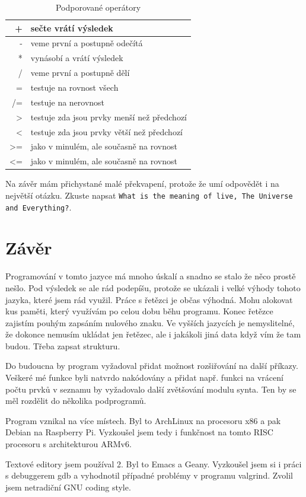 \documentclass[a4paper, 12pt]{article}
\begin{document}
\begin{table}
\centering
\begin{tabular}{|r|l|}
\hline
+ & sečte vrátí výsledek\\ \hline
- & veme první a postupně odečítá\\ \hline
* & vynásobí a vrátí výsledek\\ \hline
/ & veme první a postupně dělí\\ \hline
= & testuje na rovnost všech\\ \hline
/= & testuje na nerovnost\\ \hline
\textgreater{} & testuje zda jsou prvky menší než předchozí\\ \hline
\textless{} & testuje zda jsou prvky větší než předchozí\\ \hline
\textgreater{=} & jako v minulém, ale současně na rovnost\\ \hline
\textless{=} & jako v minulém, ale současně na rovnost\\ \hline
\end{tabular}
\caption{Podporované operátory}
\label{tab:op}
\end{table}

Na závěr mám přichystané malé překvapení, protože že umí odpovědět i
na největší otázku. Zkuste napsat \texttt{What is the meaning of live,
  The Universe and Everything?}.

\section{Závěr}
Programování v tomto jazyce má mnoho úskalí a snadno se stalo že něco
prostě nešlo. Pod výsledek se ale rád podepíšu, protože se ukázali i
velké výhody tohoto jazyka, které jsem rád využil. Práce s řetězci je
občas výhodná. Mohu alokovat kus paměti, který využívám po celou dobu
běhu programu. Konec řetězce zajistím pouhým zapsáním nulového
znaku. Ve vyšších jazycích je nemyslitelné, že dokonce nemusím ukládat
jen řetězec, ale i jakákoli jiná data když vím že tam budou. Třeba
zapsat strukturu.

Do budoucna by program vyžadoval přidat možnost rozšiřování na další
příkazy. Veškeré mé funkce byli natvrdo nakódovány a přidat např.
funkci na vrácení počtu prvků v seznamu by vyžadovalo další zvětšování
modulu \textsf{synta}. Ten by se měl rozdělit do několika podprogramů.

Program vznikal na více místech. Byl to ArchLinux na procesoru x86 a
pak Debian na Raspberry Pi. Vyzkoušel jsem tedy i funkčnost na tomto
RISC procesoru s architekturou ARMv6.

Textové editory jsem používal 2. Byl to Emacs a Geany. Vyzkoušel jsem si i
práci s debuggerem \textsf{gdb} a vyhodnotil případné problémy v
programu \textsf{valgrind}. Zvolil jsem netradiční GNU coding style.

\nocite{wiki:cpro}
\nocite{pred:c}

\end{document}
